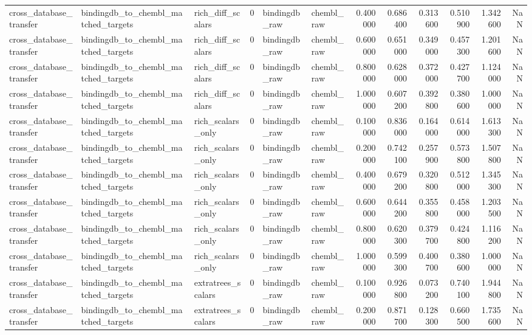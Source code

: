 \begin{longtable}{lllrllrrrrrr}
cross\_database\_transfer & bindingdb\_to\_chembl\_matched\_targets & rich\_diff\_scalars & 0 & bindingdb\_raw & chembl\_raw & 0.400000 & 0.686400 & 0.313600 & 0.510900 & 1.342600 & NaN \\
cross\_database\_transfer & bindingdb\_to\_chembl\_matched\_targets & rich\_diff\_scalars & 0 & bindingdb\_raw & chembl\_raw & 0.600000 & 0.651000 & 0.349000 & 0.457300 & 1.201600 & NaN \\
cross\_database\_transfer & bindingdb\_to\_chembl\_matched\_targets & rich\_diff\_scalars & 0 & bindingdb\_raw & chembl\_raw & 0.800000 & 0.628000 & 0.372000 & 0.427700 & 1.124000 & NaN \\
cross\_database\_transfer & bindingdb\_to\_chembl\_matched\_targets & rich\_diff\_scalars & 0 & bindingdb\_raw & chembl\_raw & 1.000000 & 0.607200 & 0.392800 & 0.380600 & 1.000000 & NaN \\
cross\_database\_transfer & bindingdb\_to\_chembl\_matched\_targets & rich\_scalars\_only & 0 & bindingdb\_raw & chembl\_raw & 0.100000 & 0.836000 & 0.164000 & 0.614000 & 1.613300 & NaN \\
cross\_database\_transfer & bindingdb\_to\_chembl\_matched\_targets & rich\_scalars\_only & 0 & bindingdb\_raw & chembl\_raw & 0.200000 & 0.742100 & 0.257900 & 0.573800 & 1.507800 & NaN \\
cross\_database\_transfer & bindingdb\_to\_chembl\_matched\_targets & rich\_scalars\_only & 0 & bindingdb\_raw & chembl\_raw & 0.400000 & 0.679200 & 0.320800 & 0.512000 & 1.345300 & NaN \\
cross\_database\_transfer & bindingdb\_to\_chembl\_matched\_targets & rich\_scalars\_only & 0 & bindingdb\_raw & chembl\_raw & 0.600000 & 0.644200 & 0.355800 & 0.458000 & 1.203500 & NaN \\
cross\_database\_transfer & bindingdb\_to\_chembl\_matched\_targets & rich\_scalars\_only & 0 & bindingdb\_raw & chembl\_raw & 0.800000 & 0.620300 & 0.379700 & 0.424800 & 1.116200 & NaN \\
cross\_database\_transfer & bindingdb\_to\_chembl\_matched\_targets & rich\_scalars\_only & 0 & bindingdb\_raw & chembl\_raw & 1.000000 & 0.599300 & 0.400700 & 0.380600 & 1.000000 & NaN \\
cross\_database\_transfer & bindingdb\_to\_chembl\_matched\_targets & extratrees\_scalars & 0 & bindingdb\_raw & chembl\_raw & 0.100000 & 0.926800 & 0.073200 & 0.740100 & 1.944800 & NaN \\
cross\_database\_transfer & bindingdb\_to\_chembl\_matched\_targets & extratrees\_scalars & 0 & bindingdb\_raw & chembl\_raw & 0.200000 & 0.871700 & 0.128300 & 0.660500 & 1.735600 & NaN \\

\end{longtable}
